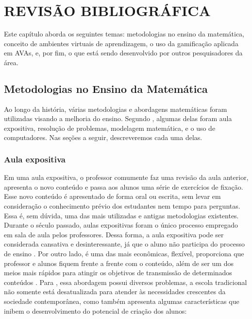 \chapter{REVISÃO BIBLIOGRÁFICA}
\label{cap:fundamentacao-teorica}

Este capítulo aborda os seguintes temas: metodologias no ensino da matemática, conceito de ambientes virtuais de aprendizagem, o uso da gamificação aplicada em AVAs, e, por fim, o que está sendo 
desenvolvido por outros pesquisadores da área.

\section{Metodologias no Ensino da Matemática}

Ao longo da história, várias metodologias e abordagens matemáticas foram utilizadas visando a melhoria do ensino. Segundo , algumas delas foram aula expositiva, 
resolução de problemas, modelagem matemática, e o uso de computadores. Nas seções a seguir, descreveremos cada uma delas.

\subsection{Aula expositiva}

Em uma aula expositiva, o professor comumente faz uma revisão da aula anterior, apresenta o novo conteúdo e passa aos alunos uma 
série de exercícios de fixação. Esse novo conteúdo é apresentado de forma oral ou escrita, sem levar em consideração o conhecimento 
prévio dos estudantes nem tempo para perguntas. Essa é, sem dúvida, uma das mais utilizadas e antigas metodologias existentes. Durante 
o século passado, aulas expositivas foram o único processo empregado em sala de aula pelos professores. Dessa forma, a aula expositiva pode 
ser considerada cansativa e desinteressante, já que o aluno não participa do processo de ensino  \cite{hammes2003tendencias}. Por outro 
lado, \'e uma das mais econômicas, flexível, proporciona que professor e alunos fiquem frente a frente com o conteúdo, além de ser um dos 
meios mais rápidos para atingir os objetivos de transmissão de determinados conteúdos \cite{marconteorias}. Para 
, essa abordagem possui diversos problemas, a escola tradicional não somente está desatualizada para atender às 
necessidades crescentes da sociedade contemporânea, como também apresenta algumas características que inibem o desenvolvimento do potencial 
de criação dos alunos:

